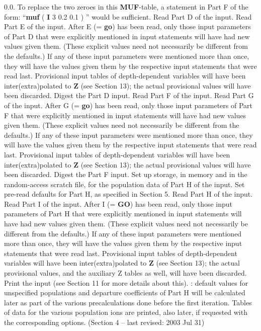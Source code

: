 0.0. To replace the two zeroes in this {\bf MUF}-table, a statement in
Part F of the form: ``{\bf muf} ( {\bf I} 3 0.2 0.1 ) '' would be
sufficient.
\space
\bull Read Part D of the input.
\space
\bull Read Part E of the input. After E (= {\bf go}) has been read, only those
input parameters of Part D that were explicitly mentioned in input
statements will have had new values given them. (These explicit values need
not necessarily be different from the defaults.) If any of these input
parameters were mentioned more than once, they will have the values given
them by the respective input statements that were read last. Provisional
input tables of depth-dependent variables will have been inter(extra)polated
to {\bf Z} (see Section 13); the actual provisional values will have been
discarded.
\space
\bull Digest the Part D input.
\space
\bull Read Part F of the input.
\space
\bull Read Part G of the input. After G (= {\bf go}) has been read, only those
input parameters of Part F that were explicitly mentioned in input
statements will have had new values given them. (These explicit values need
not necessarily be different from the defaults.) If any of these input
parameters were mentioned more than once, they will have the values given
them by the respective input statements that were read last. Provisional
input tables of depth-dependent variables will have been inter(extra)polated
to {\bf Z} (see Section 13); the actual provisional values will have been
discarded.
\space
\bull Digest the Part F input.
\ej
\bull Set up storage, in memory and in the random-access scratch file, for the
population data of Part H of the input.
\space
\bull Set pre-read defaults for Part H, as specified in Section 5.
\space
\bull Read Part H of the input.
\space
\bull Read Part I of the input. After I (= {\bf GO}) has been read, only those
input parameters of Part H that were explicitly mentioned in input statements
will have had new values given them. (These explicit values need not
necessarily be different from the defaults.) If any of these input parameters
were mentioned more than once, they will have the values given them by the
respective input statements that were read last. Provisional input tables of
depth-dependent variables will have been inter(extra)polated to {\bf Z}
(see Section 13); the actual provisional values, and the auxiliary Z tables
as well, will have been discarded.
\space
\bull Print the input (see Section 11 for more details about this).
\blankline
\blankline
\blankline
{}: 
default values for unspecified populations and departure coefficients
of Part H will be calculated later as part of the various precalculations 
done before the first iteration. Tables of data for the various population
ions are printed, also later, if requested with the corresponding options.
\blankline
\vfill
\noindent (Section 4 -- last revised: 2003 Jul 31) \par
{}
\ej
